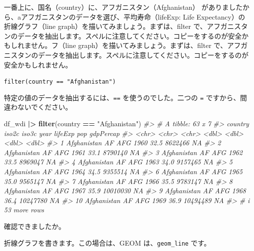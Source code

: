 \documentclass[
  xelatex, ja=standard]{bxjsbook}
\newenvironment{Shaded}{\begin{snugshade}}{\end{snugshade}}
\newcommand{\CommentTok}[1]{\textcolor[rgb]{0.56,0.35,0.01}{\textit{#1}}}
\newcommand{\FunctionTok}[1]{\textcolor[rgb]{0.13,0.29,0.53}{\textbf{#1}}}
\newcommand{\NormalTok}[1]{#1}
\newcommand{\SpecialCharTok}[1]{\textcolor[rgb]{0.81,0.36,0.00}{\textbf{#1}}}
\newcommand{\StringTok}[1]{\textcolor[rgb]{0.31,0.60,0.02}{#1}}
\theoremstyle{definition}
\theoremstyle{definition}
\theoremstyle{definition}
\theoremstyle{definition}
\theoremstyle{remark}
\begin{document}
一番上に、国名（country）に、アフガニスタン（Afghanistan） がありましたから、aアフガニスタンのデータを選び、平均寿命（lifeExp: Life Expectancy）の折線グラフ（line graph）を描いてみましょう。まずは、filter で、アフガニスタンのデータを抽出します。スペルに注意してください。コピーをするのが安全かもしれません。フ（line graph）を描いてみましょう。まずは、filter で、アフガニスタンのデータを抽出します。スペルに注意してください。コピーをするのが安全かもしれません。

\texttt{filter(country\ ==\ "Afghanistan")}

特定の値のデータを抽出するには、\texttt{==} を使うのでした。二つの \texttt{=} ですから、間違わないでください。

\begin{Shaded}
\begin{Highlighting}[]
\NormalTok{df\_wdi }\SpecialCharTok{|\textgreater{}} \FunctionTok{filter}\NormalTok{(country }\SpecialCharTok{==} \StringTok{"Afghanistan"}\NormalTok{)}
\CommentTok{\#\textgreater{} \# A tibble: 63 x 7}
\CommentTok{\#\textgreater{}    country     iso2c iso3c  year lifeExp      pop gdpPercap}
\CommentTok{\#\textgreater{}    \textless{}chr\textgreater{}       \textless{}chr\textgreater{} \textless{}chr\textgreater{} \textless{}dbl\textgreater{}   \textless{}dbl\textgreater{}    \textless{}dbl\textgreater{}     \textless{}dbl\textgreater{}}
\CommentTok{\#\textgreater{}  1 Afghanistan AF    AFG    1960    32.5  8622466        NA}
\CommentTok{\#\textgreater{}  2 Afghanistan AF    AFG    1961    33.1  8790140        NA}
\CommentTok{\#\textgreater{}  3 Afghanistan AF    AFG    1962    33.5  8969047        NA}
\CommentTok{\#\textgreater{}  4 Afghanistan AF    AFG    1963    34.0  9157465        NA}
\CommentTok{\#\textgreater{}  5 Afghanistan AF    AFG    1964    34.5  9355514        NA}
\CommentTok{\#\textgreater{}  6 Afghanistan AF    AFG    1965    35.0  9565147        NA}
\CommentTok{\#\textgreater{}  7 Afghanistan AF    AFG    1966    35.5  9783147        NA}
\CommentTok{\#\textgreater{}  8 Afghanistan AF    AFG    1967    35.9 10010030        NA}
\CommentTok{\#\textgreater{}  9 Afghanistan AF    AFG    1968    36.4 10247780        NA}
\CommentTok{\#\textgreater{} 10 Afghanistan AF    AFG    1969    36.9 10494489        NA}
\CommentTok{\#\textgreater{} \# i 53 more rows}
\end{Highlighting}
\end{Shaded}

確認できましたか。

折線グラフを書きます。この場合は、GEOM は、\texttt{geom\_line} です。
\end{document}
